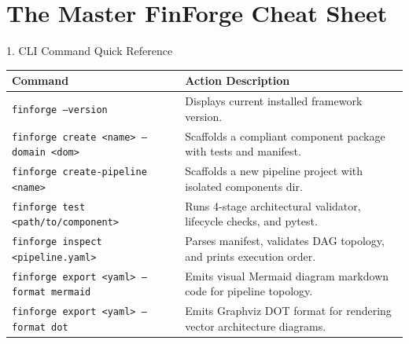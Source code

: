 \documentclass[11pt,a4paper]{article}
\begin{document}
\section{The Master FinForge Cheat Sheet}

\begin{cheatsheetcard}{1. CLI Command Quick Reference}
\small
\begin{tabularx}{\linewidth}{p{5.5cm} X}
\textbf{Command} & \textbf{Action Description} \\
\midrule
\texttt{finforge --version} & Displays current installed framework version. \\
\texttt{finforge create <name> --domain <dom>} & Scaffolds a compliant component package with tests and manifest. \\
\texttt{finforge create-pipeline <name>} & Scaffolds a new pipeline project with isolated components dir. \\
\texttt{finforge test <path/to/component>} & Runs 4-stage architectural validator, lifecycle checks, and pytest. \\
\texttt{finforge inspect <pipeline.yaml>} & Parses manifest, validates DAG topology, and prints execution order. \\
\texttt{finforge export <yaml> --format mermaid} & Emits visual Mermaid diagram markdown code for pipeline topology. \\
\texttt{finforge export <yaml> --format dot} & Emits Graphviz DOT format for rendering vector architecture diagrams. \\
\end{tabularx}
\end{cheatsheetcard}

\vspace{6pt}
\end{document}
